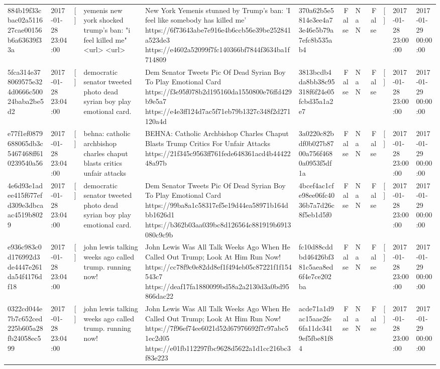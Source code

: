 \begin{tabular}{llllllrlrlll}
884b19f33cbac02a511627cae00156b6a63639f33a & 2017-01-28 23:04:00 & [] & yemenis new york shocked trump's ban: "i feel killed me" <url> <url> & New York Yemenis stunned by Trump's ban: 'I feel like somebody has killed me' https://6f73643abe7e916e4b6ccb56e39be252841a523de3 https://e4602a52099f7fc140366bf7844f3634ba1f714809 & 370a62b5e5814e3ee4a73e46e5b79a7efc8b535ab4 & False & NaN & False & [] & 2017-01-28 23:00:00 & 2017-01-29 00:00:00 \\
5fca314e378069575e324d0666c50024baba2be5d2 & 2017-01-28 23:04:00 & [] & democratic senator tweeted photo dead syrian boy play emotional card. & Dem Senator Tweets Pic Of Dead Syrian Boy To Play Emotional Card https://f3e95f078b2d195160da1550800e76ffd429b9e5a7 https://e4e3ff124d7ac5f71eb79b1327c348f2d271120a4d & 3813bcdb4da8bb38c95318f6f24e05fcbd35a1a2e7 & False & NaN & False & [] & 2017-01-28 23:00:00 & 2017-01-29 00:00:00 \\
e77f1ef0879688065db3c5467468ff610239540a56 & 2017-01-28 23:04:00 & [] & behna: catholic archbishop charles chaput blasts critics unfair attacks & BEHNA: Catholic Archbishop Charles Chaput Blasts Trump Critics For Unfair Attacks https://21f345c9563ff761fede648361acd4b4442248a97b & 3a0220c82bdf0b027b8700a756f4680a0953f5df1a & False & NaN & False & [] & 2017-01-28 23:00:00 & 2017-01-29 00:00:00 \\
4e6d93e1adee415f677efd309e3dbcaac4519b8029 & 2017-01-28 23:04:00 & [] & democratic senator tweeted photo dead syrian boy play emotional card. & Dem Senator Tweets Pic Of Dead Syrian Boy To Play Emotional Card https://99ba8a1c58317ef5e19d44ea58971b164dbb1626d1 https://b362b03aa039bc8d126564c881919b6913080c9c9b & 4bcef4ac1cfe98ee06fc4036b7a7d26c8f5eb1d5f0 & False & NaN & False & [] & 2017-01-28 23:00:00 & 2017-01-29 00:00:00 \\
e936c983c0d176992d3de4447e261da54f4176df18 & 2017-01-28 23:04:00 & [] & john lewis talking weeks ago called trump. running now! & John Lewis Was All Talk Weeks Ago When He Called Out Trump; Look At Him Run Now! https://cc78f9c0e82dd8ef1f494eb05c87221f1f154543c7 https://deaf17fa1880099bd58a2a2130d3a0bd95866dac22 & fc10d88cddbd46426bf381c5aea8ed6f4e7ce202ba & False & NaN & False & [] & 2017-01-28 23:00:00 & 2017-01-29 00:00:00 \\
0322cd044e7b7c652ced225b605a28fb24058ec599 & 2017-01-28 23:04:00 & [] & john lewis talking weeks ago called trump. running now! & John Lewis Was All Talk Weeks Ago When He Called Out Trump; Look At Him Run Now! https://7f96ef74ee6021d52d67976692f7c97abc51ec2d05 https://e01fb112297fbc9628d5622a1d1cc216bc3f83e223 & acde71a1d9ac15aae2fe6fa11dc3419ef5fbe81f84 & False & NaN & False & [] & 2017-01-28 23:00:00 & 2017-01-29 00:00:00 \\

\end{tabular}
